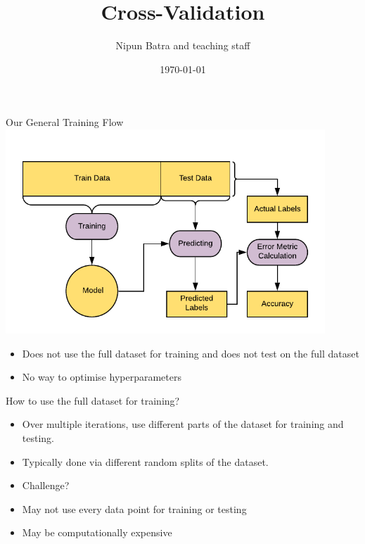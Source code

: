 \documentclass[usenames,dvipsnames]{beamer}
\title{Cross-Validation}
\date{\today}
\author{Nipun Batra and teaching staff}
\institute{IIT Gandhinagar}
\begin{document}
	\maketitle
	
	


\begin{frame}{Our General Training Flow}
\includegraphics[width = 0.9\textwidth]{../assets/cross-validation/diagrams/general-workflow}
\begin{itemize}
	\item \pause Does not use the full dataset for training and does not test on the full dataset
	\item \pause No way to optimise hyperparameters
\end{itemize}
\end{frame}

\begin{frame}{How to use the full dataset for training?}
\begin{itemize}
	\item \pause Over multiple iterations, use different parts of the dataset for training and testing.
	\item \pause Typically done via different random splits of the dataset.
	\item \pause Challenge?
	\item \pause May not use every data point for training or testing
	\item \pause May be computationally expensive

\end{itemize}
	
\end{frame}
\end{document}
